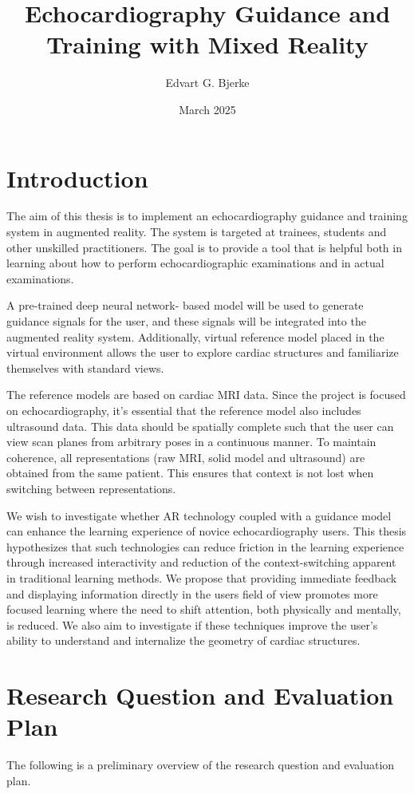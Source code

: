 \documentclass{article}
\title{Echocardiography Guidance and Training with Mixed Reality}
\author{Edvart G. Bjerke}
\date{March 2025}
\begin{document}
\maketitle

\section{Introduction}
The aim of this thesis is to implement an echocardiography guidance and training system in augmented reality. The system is targeted at trainees, students and other unskilled practitioners. 
The goal is to provide a tool that is helpful both in learning about how to perform echocardiographic examinations and in actual examinations.

A pre-trained deep neural network- based model will be used to generate guidance signals for the user, and these signals will be integrated into the augmented reality system.  
Additionally, virtual reference model placed in the virtual environment allows the user to explore cardiac structures and familiarize themselves with
standard views. 

The reference models are based on cardiac MRI data. 
Since the project is focused on echocardiography, it's essential that the reference model also includes ultrasound data.
This data should be spatially complete such that the user can view scan planes from arbitrary poses in a continuous manner.
To maintain coherence, all representations (raw MRI, solid model and ultrasound) are obtained from the same patient. 
This ensures that context is not lost when switching between representations.

We wish to investigate whether AR technology coupled with a guidance model can enhance the learning experience of novice echocardiography users.
This thesis hypothesizes that such technologies can reduce friction in the learning experience through increased interactivity and reduction of the context-switching
apparent in traditional learning methods. We propose that providing immediate feedback and displaying information directly in the users field of view 
promotes more focused learning where the need to shift attention, both physically and mentally, is reduced. We also aim to investigate if these techniques 
improve the user's ability to understand and internalize the geometry of cardiac structures.


\section{Research Question and Evaluation Plan}
The following is a preliminary overview of the research question and evaluation plan.
\end{document}
